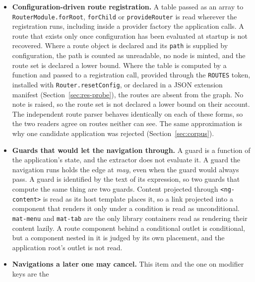 \begin{itemize}[nosep]
\begin{itemize}[nosep]
bind nothing the pass can follow.
A call through such a token therefore contributes no edge.
It falls back to the join over every component that injects its class, or to no scope at all if none
does.
\end{itemize}
Over the corpus the pass resolved \CGDirect{} calls on application types to the class the type names,
\CGBound{} through a provider binding and \CGSubclass{} to subclasses, and left \CGUnresolved{}
unresolved, in \CGUnresolvedApps{} of the six applications.
\item \textbf{Configuration-driven route registration.} A table passed as an array to
\texttt{RouterModule.forRoot}, \texttt{forChild} or \texttt{provideRouter} is read wherever the
registration runs, including inside a provider factory the application calls.
A route
that exists only once configuration has been evaluated at startup is not recovered. Where a route object is declared and its
\texttt{path} is supplied by configuration, the path is counted as unreadable, no node is minted, and
the route set is declared a lower bound. Where the table is computed by a function and passed to a
registration call, provided through the \texttt{ROUTES} token, installed with \texttt{Router.resetConfig},
or declared in a JSON extension manifest (Section~\ref{sec:res-probe}), the routes are absent from the
graph.
No note is raised, so the route set is not declared a lower bound on their account. The
independent route parser behaves identically on each of these forms, so the two readers agree on routes
neither can see. The same approximation is why one candidate application was rejected
(Section~\ref{sec:corpus}).
\item \textbf{Guards that would let the navigation through.} A guard is a function of the application's
state, and the extractor does not evaluate it. A guard the navigation runs holds the edge at \emph{may},
even when the guard would always pass. A guard is identified by the text of its expression, so two guards that compute the same thing are two
guards. Content projected through \texttt{<ng-content>} is read as its host template places it, so a link
projected into a component that renders it only under a condition is read as unconditional. \texttt{mat-menu} and \texttt{mat-tab} are the only library containers read as rendering their content lazily. A route component behind a conditional outlet is conditional, but a component nested in it is judged by its own placement, and the application root's outlet is not read.
\item \textbf{Navigations a later one may cancel.} This item and the one on modifier keys are the

\end{itemize}
